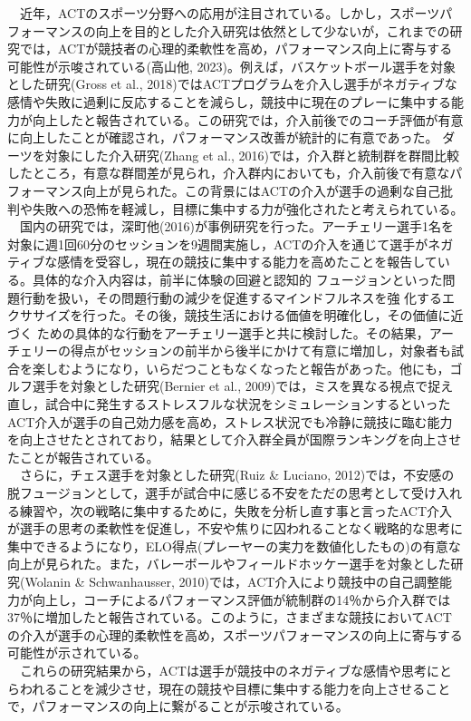 \documentclass[12pt,a4paper,xelatex,ja=standard]{bxjsarticle}
\begin{document}
　近年，ACTのスポーツ分野への応用が注目されている。しかし，スポーツパフォーマンスの向上を目的とした介入研究は依然として少ないが，これまでの研究では，ACTが競技者の心理的柔軟性を高め，パフォーマンス向上に寄与する可能性が示唆されている(高山他,
2023)。例えば，バスケットボール選手を対象とした研究(Gross et al.,
2018)ではACTプログラムを介入し選手がネガティブな感情や失敗に過剰に反応することを減らし，競技中に現在のプレーに集中する能力が向上したと報告されている。この研究では，介入前後でのコーチ評価が有意に向上したことが確認され，パフォーマンス改善が統計的に有意であった。
ダーツを対象にした介入研究(Zhang et al.,
2016)では，介入群と統制群を群間比較したところ，有意な群間差が見られ，介入群内においても，介入前後で有意なパフォーマンス向上が見られた。この背景にはACTの介入が選手の過剰な自己批判や失敗への恐怖を軽減し，目標に集中する力が強化されたと考えられている。\\
　国内の研究では，深町他(2016)が事例研究を行った。アーチェリー選手1名を対象に週1回60分のセッションを9週間実施し，ACTの介入を通じて選手がネガティブな感情を受容し，現在の競技に集中する能力を高めたことを報告している。具体的な介入内容は，前半に体験の回避と認知的
フュージョンといった問題行動を扱い，その問題行動の減少を促進するマインドフルネスを強
化するエクササイズを行った。その後，競技生活における価値を明確化し，その価値に近づく
ための具体的な行動をアーチェリー選手と共に検討した。その結果，アーチェリーの得点がセッションの前半から後半にかけて有意に増加し，対象者も試合を楽しむようになり，いらだつこともなくなったと報告があった。他にも，ゴルフ選手を対象とした研究(Bernier
et al.,
2009)では，ミスを異なる視点で捉え直し，試合中に発生するストレスフルな状況をシミュレーションするといったACT介入が選手の自己効力感を高め，ストレス状況でも冷静に競技に臨む能力を向上させたとされており，結果として介入群全員が国際ランキングを向上させたことが報告されている。\\
　さらに，チェス選手を対象とした研究(Ruiz \& Luciano,
2012)では，不安感の脱フュージョンとして，選手が試合中に感じる不安をただの思考として受け入れる練習や，次の戦略に集中するために，失敗を分析し直す事と言ったACT介入が選手の思考の柔軟性を促進し，不安や焦りに囚われることなく戦略的な思考に集中できるようになり，ELO得点(プレーヤーの実力を数値化したもの)の有意な向上が見られた。また，バレーボールやフィールドホッケー選手を対象とした研究(Wolanin
\& Schwanhausser,
2010)では，ACT介入により競技中の自己調整能力が向上し，コーチによるパフォーマンス評価が統制群の14％から介入群では37％に増加したと報告されている。このように，さまざまな競技においてACTの介入が選手の心理的柔軟性を高め，スポーツパフォーマンスの向上に寄与する可能性が示されている。\\
　これらの研究結果から，ACTは選手が競技中のネガティブな感情や思考にとらわれることを減少させ，現在の競技や目標に集中する能力を向上させることで，パフォーマンスの向上に繋がることが示唆されている。
\end{document}
